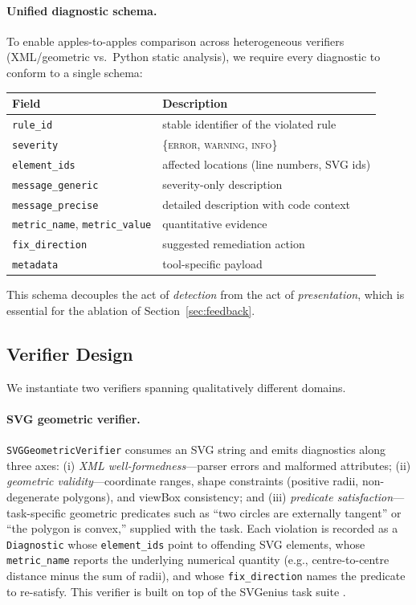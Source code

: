 \paragraph{Unified diagnostic schema.}
To enable apples-to-apples comparison across heterogeneous verifiers (XML/geometric vs.\ Python static analysis), we require every diagnostic to conform to a single schema:
\begin{center}
\small
\begin{tabular}{ll}
\toprule
Field & Description \\
\midrule
\texttt{rule\_id} & stable identifier of the violated rule \\
\texttt{severity} & \{\textsc{error}, \textsc{warning}, \textsc{info}\} \\
\texttt{element\_ids} & affected locations (line numbers, SVG ids) \\
\texttt{message\_generic} & severity-only description \\
\texttt{message\_precise} & detailed description with code context \\
\texttt{metric\_name}, \texttt{metric\_value} & quantitative evidence \\
\texttt{fix\_direction} & suggested remediation action \\
\texttt{metadata} & tool-specific payload \\
\bottomrule
\end{tabular}
\end{center}
This schema decouples the act of \emph{detection} from the act of \emph{presentation}, which is essential for the ablation of Section~\ref{sec:feedback}.

\subsection{Verifier Design}
\label{sec:verifiers}

We instantiate two verifiers spanning qualitatively different domains.

\paragraph{SVG geometric verifier.}
\texttt{SVGGeometricVerifier} consumes an SVG string and emits diagnostics along three axes: (i) \emph{XML well-formedness}---parser errors and malformed attributes; (ii) \emph{geometric validity}---coordinate ranges, shape constraints (positive radii, non-degenerate polygons), and viewBox consistency; and (iii) \emph{predicate satisfaction}---task-specific geometric predicates such as ``two circles are externally tangent'' or ``the polygon is convex,'' supplied with the task. Each violation is recorded as a \texttt{Diagnostic} whose \texttt{element\_ids} point to offending SVG elements, whose \texttt{metric\_name} reports the underlying numerical quantity (e.g., centre-to-centre distance minus the sum of radii), and whose \texttt{fix\_direction} names the predicate to re-satisfy. This verifier is built on top of the SVGenius task suite \cite{cao2024svgenius}.

